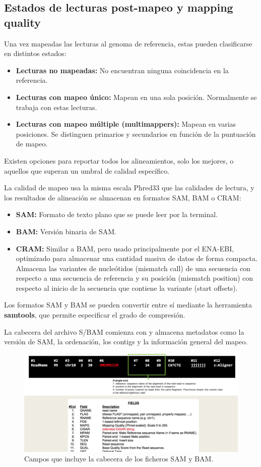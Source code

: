 \begin{itemize}
\subsection{Estados de lecturas post-mapeo y mapping quality}
Una vez mapeadas las lecturas al genoma de referencia, estas pueden clasificarse en distintos estados:
\begin{itemize}
\item \textbf{Lecturas no mapeadas:} No encuentran ninguna coincidencia en la referencia.
\item \textbf{Lecturas con mapeo único:} Mapean en una sola posición. Normalmente se trabaja con estas lecturas.
\item \textbf{Lecturas con mapeo múltiple (multimappers):} Mapean en varias posiciones. Se distinguen primarios y secundarios en función de la puntuación de mapeo.
\end{itemize}

Existen opciones para reportar todos los alineamientos, solo los mejores, o aquellos que superan un umbral de calidad específico.

La calidad de mapeo usa la misma escala Phred33 que las calidades de lectura, y los resultados de alineación se almacenan en formatos SAM, BAM o CRAM:
\begin{itemize}
\item \textbf{SAM:} Formato de texto plano que se puede leer por la terminal.
\item \textbf{BAM:} Versión binaria de SAM.
\item \textbf{CRAM:} Similar a BAM, pero usado principalmente por el ENA-EBI, optimizado para almacenar una cantidad masiva de datos de forma compacta. Almacena las variantes de nucleótidos (mismatch call) de una secuencia con respecto a una secuencia de referencia y su posición (mismatch position) con respecto al inicio de la secuencia que contiene la variante (start offsets).
\end{itemize}

Los formatos SAM y BAM se pueden convertir entre sí mediante la herramienta \textbf{samtools}, que permite especificar el grado de compresión.

La cabecera del archivo S/BAM comienza con \@ y almacena metadatos como la versión de SAM, la ordenación, los contigs y la información general del mapeo. 
\begin{figure}
\centering
\includegraphics[width = \textwidth]{figs/sam-header.png}
\caption{Campos que incluye la cabecera de los ficheros SAM y BAM.}
\end{figure}


\end{itemize}
